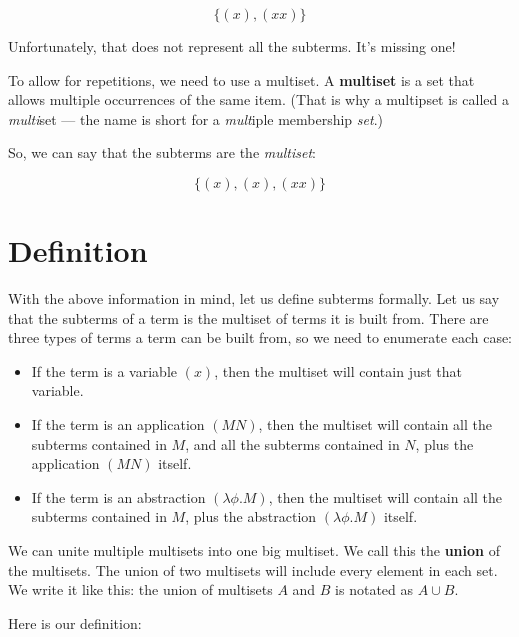 \documentclass{book}
\numberwithin{equation}{chapter}
\newcommand{\vocab}{\textbf}
\begin{document}
\begin{equation}
\{ (x), (x x) \}
\end{equation}

\noindent
Unfortunately, that does not represent all the subterms. It's missing one!

To allow for repetitions, we need to use a multiset. A \vocab{multiset} is a set that allows multiple occurrences of the same item. (That is why a multipset is called a \textit{multi}set --- the name is short for a \textit{mult}iple membership \textit{set}.)

So, we can say that the subterms are the \textit{multiset}:

\begin{equation}
\{ (x), (x), (x x) \}
\end{equation}


\section{Definition}

With the above information in mind, let us define subterms formally. Let us say that the subterms of a term is the multiset of terms it is built from. There are three types of terms a term can be built from, so we need to enumerate each case:

\begin{itemize}
\item{If the term is a variable $(x)$, then the multiset will contain just that variable.}
\item{If the term is an application $(M N)$, then the multiset will contain all the subterms contained in $M$, and all the subterms contained in $N$, plus the application $(M N)$ itself.}
\item{If the term is an abstraction $(\lambda \phi.M)$, then the multiset will contain all the subterms contained in $M$, plus the abstraction $(\lambda \phi.M)$ itself.}
\end{itemize}

\noindent
We can unite multiple multisets into one big multiset. We call this the \vocab{union} of the multisets. The union of two multisets will include every element in each set. We write it like this: the union of multisets $A$ and $B$ is notated as $A \cup B$.

Here is our definition:
\end{document}
